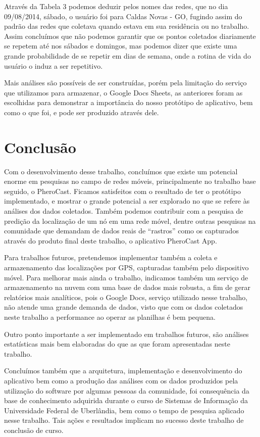 \documentclass[12pt, %
openright, 
oneside,
a4paper,
brazil]{facom-ufu-abntex2}
\begin{document}
Através da Tabela 3 podemos deduzir pelos nomes das redes, que no dia 09/08/2014, sábado, o usuário foi para Caldas Novas - GO, fugindo assim do padrão das redes que coletava quando estava em sua residência ou no trabalho. Assim concluímos que não podemos garantir que os pontos coletados diariamente se repetem até nos sábados e domingos, mas podemos dizer que existe uma grande probabilidade de se repetir em dias de semana, onde a rotina de vida do usuário o induz a ser repetitivo.


Mais análises são possíveis de ser construídas, porém pela limitação do serviço que utilizamos para armazenar, o Google Docs Sheets, as anteriores foram as escolhidas para demonstrar a importância do nosso protótipo de aplicativo, bem como o que foi, e pode ser produzido através dele.



\chapter{Conclusão}


Com o desenvolvimento desse trabalho, concluímos que existe um potencial enorme em pesquisas no campo de redes móveis, principalmente no trabalho base seguido, o PheroCast. Ficamos satisfeitos com o resultado de ter o protótipo implementado, e mostrar o grande potencial a ser explorado no que se refere às análises dos dados coletados. Também podemos contribuir com a pesquisa de predição da localização de um nó em uma rede móvel, dentre outras pesquisas na comunidade que demandam de dados reais de ``rastros'' como os capturados através do produto final deste trabalho, o aplicativo PheroCast App.


Para trabalhos futuros, pretendemos implementar também a coleta e armazenamento das localizações por GPS, capturadas também pelo dispositivo móvel. Para melhorar mais ainda o trabalho, indicamos também um serviço de armazenamento na nuvem com uma base de dados mais robusta, a fim de gerar relatórios mais analíticos, pois o Google Docs, serviço utilizado nesse trabalho, não atende uma grande demanda de dados, visto que com os dados coletados neste trabalho a performance ao operar as planilhas é bem pequena. 

Outro ponto importante a ser implementado em trabalhos futuros, são análises estatísticas mais bem elaboradas do que as que foram apresentadas neste trabalho. 

Concluímos também que a arquitetura, implementação e desenvolvimento do aplicativo bem como a produção das análises com os dados produzidos pela utilização do software por algumas pessoas da comunidade, foi consequência da base de conhecimento adquirida durante o curso de Sistemas de Informação da Universidade Federal de Uberlândia, bem como o tempo de pesquisa aplicado nesse trabalho. Tais ações e resultados implicam no sucesso deste trabalho de conclusão de curso.
\end{document}
